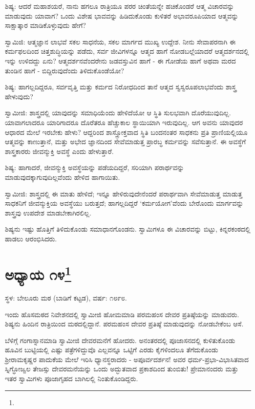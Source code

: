 ಶಿಷ್ಯ: ಆದರೆ ಮಹಾಶಯರೆ, ನಾನು ಹಗಲೂ ರಾತ್ರಿಯೂ ಪರರ ಚಿಂತೆಯನ್ನೇ ಹಚಿಕೊಂಡರೆ ಆತ್ಮ ವಿಚಾರವನ್ನು ಮಾಡುವುದು ಯಾವಾಗ? ಒಂದು ವಿಶೇಷ ಭಾವವನ್ನು ಹಿಡಿದುಕೊಂಡು ಕುಳಿತರೆ ಅಭಾವರೂಪಿಯಾದ ಆತ್ಮವನ್ನು ಸಾಕ್ಷಾತ್ಕಾರ ಮಾಡಿಕೊಳ್ಳುವುದು ಹೇಗೆ?

ಸ್ವಾಮಿಜಿ: ಆತ್ಮಜ್ಞಾನ ಲಾಭವೆ ಸಕಲ ಸಾಧನೆಯ, ಸಕಲ ಮಾರ್ಗದ ಮುಖ್ಯ ಉದ್ದೇಶ. ನೀನು ಸೇವಾಪರನಾಗಿ ಈ ಕರ್ಮಫಲದಿಂದ ಚಿತ್ತಶುದ್ಧಿಯನ್ನು ಪಡೆದು, ಸರ್ವ ಜೀವಿಗಳನ್ನೂ ಆತ್ಮದ ಹಾಗೆ ನೋಡಬಲ್ಲೆಯಾದರೆ ಆತ್ಮದರ್ಶನದಲ್ಲಿ ಇನ್ನು ಉಳಿದದ್ದು ಏನು? ಆತ್ಮದರ್ಶನವೆಂದರೇನು ಜಡವಸ್ತುವಿನ ಹಾಗೆ - ಈ ಗೋಡೆಯ ಹಾಗೆ ಅಥವಾ ಮರದ ತುಂಡಿನ ಹಾಗೆ - ಬಿದ್ದಿರುವುದೆಂದು ತಿಳಿದುಕೊಂಡೆಯೋ?

ಶಿಷ್ಯ: ಹಾಗಲ್ಲದಿದ್ದರೂ, ಸರ್ವವೃತ್ತಿ ಮತ್ತು ಕರ್ಮದ ನಿರೋಧದಿಂದ ತಾನೆ ಆತ್ಮದ ಸ್ವಸ್ವರೂಪಲಾಭವೆಂದು ಶಾಸ್ತ್ರ ಹೇಳುವುದು?

ಸ್ವಾಮೀಜಿ: ಶಾಸ್ತ್ರದಲ್ಲಿ ಯಾವುದನ್ನು ಸಮಾಧಿಯೆಂದು ಹೇಳಿದೆಯೋ ಆ ಸ್ಥಿತಿ ಸುಲಭವಾಗಿ ದೊರೆಯುವುದಿಲ್ಲ. ಯಾವಾಗಲಾದರೂ ಯಾರಿಗಾದರೂ ದೊರೆತರೂ ಹೆಚ್ಚುಕಾಲ ಸ್ಥಾಯಿಯಾಗಿ ಇರುವುದಿಲ್ಲ. ಆಗ ಅವನು ಯಾವುದರ ಆಧಾರದ ಮೇಲೆ ಇರಬೇಕು ಹೇಳು? ಆದ್ದರಿಂದ ಶಾಸ್ತ್ರೋಕ್ತವಾದ ಸ್ಥಿತಿ ಬಂದನಂತರ ಸಾಧಕನು ಪ್ರತಿ ಪ್ರಾಣಿಯಲ್ಲಿಯೂ ಆತ್ಮವನ್ನು ಕಾಣುತ್ತಾನೆ, ಮತ್ತು ಅಭೇದ ಜ್ಞಾನದಿಂದ ಸೇವೆಮಾಡುತ್ತ ಪ್ರಾರಬ್ಧ ಕರ್ಮವನ್ನು ಸವೆಸುತ್ತಾನೆ. ಈ ಅವಸ್ಥೆಗೆ ಶಾಸ್ತ್ರಕಾರರು ಜೀವನ್ಮುಕ್ತಿ ಅವಸ್ಥೆ ಎಂದು ಹೇಳುತ್ತಾರೆ.

ಶಿಷ್ಯ: ಹಾಗಾದರೆ, ಜೀವನ್ಮುಕ್ತಿ ಅವಸ್ಥೆಯನ್ನು ಪಡೆಯದಿದ್ದರೆ, ಸರಿಯಾಗಿ ಪರಾರ್ಥವನ್ನು ಮಾಡುವುದಕ್ಕಾಗುವುದಿಲ್ಲವೆಂದು ಹೇಳಿದ ಹಾಗಾಯಿತು.

ಸ್ವಾಮೀಜಿ: ಶಾಸ್ತ್ರದಲ್ಲಿ ಈ ಮಾತು ಹೇಳಿದೆ; ಇನ್ನೂ ಹೇಳಿರುವುದೇನೆಂದರೆ ಪರಾರ್ಥವಾಗಿ ಸೇವೆಮಾಡುತ್ತ ಮಾಡುತ್ತ ಸಾಧಕನಿಗೆ ಜೀವನ್ಮುಕ್ತಿಯ ಅವಸ್ಥೆಯು ಬರುತ್ತದೆ; ಹಾಗಲ್ಲದಿದ್ದರೆ ‘ಕರ್ಮಯೋಗ’ವೆಂದು ಬೇರೊಂದು ಮಾರ್ಗವನ್ನು ಶಾಸ್ತ್ರವು ಉಪದೇಶ ಮಾಡಬೇಕಾಗಿರಲಿಲ್ಲ.

ಶಿಷ್ಯನು ಇಷ್ಟು ಹೊತ್ತಿಗೆ ತಿಳಿದುಕೊಂಡು ಸಮಾಧಾನಗೊಂಡನು. ಸ್ವಾಮಿಗಳೂ ಈ ವಿಚಾರವನ್ನು ಬಿಟ್ಟು, ಕಿನ್ನರಕಂಠದಲ್ಲಿ ಹಾಡಲು ಆರಂಭಿಸಿದರು.

\newpage

\chapter[ಅಧ್ಯಾಯ ೧೪]{ಅಧ್ಯಾಯ ೧೪\protect\footnote{}}

\begin{center}
ಸ್ಥಳ: ಬೇಲೂರು ಮಠ (ಬಾಡಿಗೆ ಕಟ್ಟಡ), ವರ್ಷ: ೧೮೯೮.
\end{center}

ಇಂದು ಹೊಸಮಠದ ನಿವೇಶನದಲ್ಲಿ ಸ್ವಾಮೀಜಿ ಹೋಮಮಾಡಿ ಪರಮಹಂಸ ದೇವರ ಪ್ರತಿಷ್ಠೆಯನ್ನು ಮಾಡುವರು. ಶಿಷ್ಯನು ಹಿಂದಿನ ರಾತ್ರಿಯಿಂದ ಮಠದಲ್ಲಿದ್ದಾನೆ. ಪರಮಹಂಸ ದೇವರ ಪ್ರತಿಷ್ಠೆ ಮಾಡುವುದನ್ನು ನೋಡಬೇಕೆಂಬ ಆಸೆ.

ಬೆಳಿಗ್ಗೆ ಗಂಗಾಸ್ನಾನಮಾಡಿ ಸ್ವಾಮೀಜಿ ದೇವರಮನೆಗೆ ಹೋದರು. ಅನಂತರದಲ್ಲಿ ಪೂಜಾಸನದಲ್ಲಿ ಕುಳಿತುಕೊಂಡು ಹೂವಿನ ಬುಟ್ಟಿಯಲ್ಲಿ ಎಷ್ಟು ಪತ್ರೆಗಳಿದ್ದುವೊ ಎಲ್ಲವನ್ನೂ ಒಟ್ಟಿಗೆ ಎರಡು ಕೈಗಳಿಂದಲೂ ತೆಗೆದುಕೊಂಡು ಶ‍್ರೀರಾಮಕೃಷ್ಣರ ಪಾದುಕೆಯ ಮೇಲೆ ಇರಿಸಿ ಧ್ಯಾನಸ್ಥರಾದರು - ಅಪೂರ್ವದರ್ಶನ! ಅವರ ಧರ್ಮ-ಪ್ರಭಾ-ವಿಭಾಸಿತವಾದ ಸ್ನಿಗ್ಧೋಜ್ವಲ ತೇಜಸ್ಸು ದೇವರಮನೆಯನ್ನು ಒಂದು ಅದ್ಭುತವಾದ ಪ್ರಕಾಶದಿಂದ ತುಂಬಿತು! ಪ್ರೇಮಾನಂದರು ಮತ್ತು ಇತರ ಸ್ವಾಮಿಗಳು ಪೂಜಾಗೃಹದ ಬಾಗಿಲಲ್ಲಿ ನಿಂತುಕೊಂಡಿದ್ದರು.

